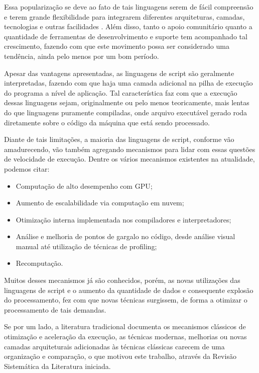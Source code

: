 \documentclass[sigconf]{acmart}
\begin{document}
Essa popularização se deve ao fato de tais linguagens serem de fácil compreensão e terem grande flexibilidade para integrarem diferentes arquiteturas, camadas, tecnologias e outras facilidades \cite{ousterhout1998scripting}. Além disso, tanto o apoio comunitário quanto a quantidade de ferramentas de desenvolvimento e suporte tem acompanhado tal crescimento, fazendo com que este movimento possa ser considerado uma tendência, ainda pelo menos por um bom período.

Apesar das vantagens apresentadas, as linguagens de script são geralmente interpretadas, fazendo com que haja uma camada adicional na pilha de execução do programa a nível de aplicação. Tal característica faz com que a execução dessas linguagens sejam, originalmente ou pelo menos teoricamente, mais lentas do que linguagens puramente compiladas, onde arquivo executável gerado roda diretamente sobre o código da máquina que está sendo processado.

Diante de tais limitações, a maioria das linguagens de script, conforme vão amadurecendo, vão também agregando mecanismos para lidar com essas questões de velocidade de execução. Dentre os vários mecanismos existentes na atualidade, podemos citar:
\begin{itemize}
\item Computação de alto desempenho com GPU;
\item Aumento de escalabilidade via computação em nuvem;
\item Otimização interna implementada nos compiladores e interpretadores;
\item Análise e melhoria de pontos de gargalo no código, desde análise visual manual até utilização de técnicas de profiling;
\item Recomputação.
\end{itemize}

Muitos desses mecanismos já são conhecidos, porém, as novas utilizações das linguagens de script e o aumento da quantidade de dados e consequente explosão do processamento, fez com que novas técnicas surgissem, de forma a otimizar o processamento de tais demandas.

Se por um lado, a literatura tradicional documenta os mecanismos clássicos de otimização e aceleração da execução, as técnicas modernas, melhorias ou novas camadas arquiteturais adicionadas às técnicas clássicas carecem de uma organização e comparação, o que motivou este trabalho, através da Revisão Sistemática da Literatura iniciada.
\end{document}
